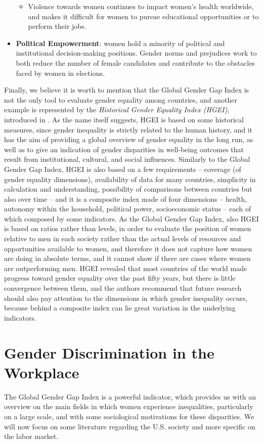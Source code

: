 \begin{itemize}
\begin{itemize}
\item Violence towards women continues to impact women's health worldwide, and makes it difficult for women to pursue educational opportunities or to perform their jobs.
\end{itemize}
\item \textbf{Political Empowerment}: women hold a minority of political and institutional decision-making positions. Gender norms and prejudices work to both reduce the number of female candidates and contribute to the obstacles faced by women in elections.
\end{itemize}

Finally, we believe it is worth to mention that the Global Gender Gap Index is not the only tool to evaluate gender equality among countries, and another example is represented by the \textit{Historical Gender Equality Index (HGEI)}, introduced in \cite{dilli2018introducing}. As the name itself suggests, HGEI is based on some historical measures, since gender inequality is strictly related to the human history, and it has the aim of providing a global overview of gender equality in the long run, as well as to give an indication of gender disparities in well-being outcomes that result from institutional, cultural, and social influences.
Similarly to the Global Gender Gap Index, HGEI is also based on a few requirements -- coverage (of gender equality dimensions), availability of data for many countries, simplicity in calculation and understanding, possibility of comparisons between countries but also over time -- and it is a composite index made of four dimensions -- health, autonomy within the household, political power, socioeconomic status -- each of which composed by some indicators.
As the Global Gender Gap Index, also HGEI is based on ratios rather than levels, in order to evaluate the position of women relative to men in each society rather than the actual levels of resources and opportunities available to women, and therefore it does not capture how women are doing in absolute terms, and it cannot show if there are cases where women are outperforming men.
HGEI revealed that most countries of the world made progress toward gender equality over the past fifty years, but there is little convergence between them, and the authors recommend that future research should also pay attention to the dimensions in which gender inequality occurs, because behind a composite index can lie great variation in the underlying indicators.


\section{Gender Discrimination in the Workplace}
The Global Gender Gap Index is a powerful indicator, which provides us with an overview on the main fields in which women experience inequalities, particularly on a large scale, and with some sociological motivations for these disparities. We will now focus on some literature regarding the U.S. society and more specific on the labor market.

